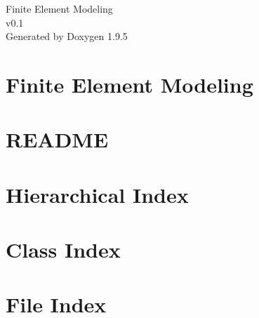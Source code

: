 \documentclass[twoside]{book}
\newcommand{\+}{\discretionary{\mbox{\scriptsize$\hookleftarrow$}}{}{}}
\newcommand{\clearemptydoublepage}{%
    \newpage{\pagestyle{empty}\cleardoublepage}%
  }
\begin{document}
  \raggedbottom
    \hypersetup{pageanchor=false,
                bookmarksnumbered=true,
                pdfencoding=unicode
               }
  \begin{titlepage}
  \vspace*{7cm}
  \begin{center}%
  {\Large Finite Element Modeling}\\
  [1ex]\large v0.\+1 \\
  \vspace*{1cm}
  {\large Generated by Doxygen 1.9.5}\\
  \end{center}
  \end{titlepage}
  \clearemptydoublepage
  \tableofcontents
  \clearemptydoublepage
  \hypersetup{pageanchor=true}
\chapter{Finite Element Modeling}
\label{index}\hypertarget{index}{}
\chapter{README}
\label{md_831_finite_element_modeling__r_e_a_d_m_e}

\chapter{Hierarchical Index}

\chapter{Class Index}

\chapter{File Index}

\end{document}
